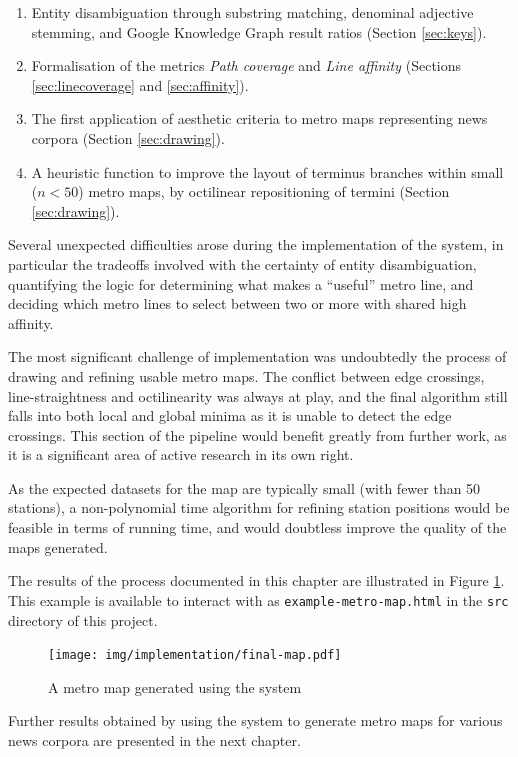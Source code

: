 \begin{enumerate}
	\item Entity disambiguation through substring matching, denominal adjective stemming, and Google Knowledge Graph result ratios (Section \ref{sec:keys}).
	\item Formalisation of the metrics \textit{Path coverage} and \textit{Line affinity} (Sections \ref{sec:linecoverage} and \ref{sec:affinity}).
	\item The first application of  aesthetic criteria to metro maps representing news corpora (Section \ref{sec:drawing}).
	\item A heuristic function to improve the layout of terminus branches within small ($n<50$) metro maps, by octilinear repositioning of termini (Section \ref{sec:drawing}). 
\end{enumerate}

Several unexpected difficulties arose during the implementation of the system, in particular the tradeoffs involved with the certainty of entity disambiguation, quantifying the logic for determining what makes a ``useful'' metro line, and deciding which metro lines to select between two or more with shared high affinity. 

The most significant challenge of implementation was undoubtedly the process of drawing and refining usable metro maps. The conflict between edge crossings, line-straightness and octilinearity was always at play, and the final algorithm still falls into both local and global minima as it is unable to detect the edge crossings. This section of the pipeline would benefit greatly from further work, as it is a significant area of active research in its own right. 

As the expected datasets for the map are typically small (with fewer than 50 stations), a non-polynomial time algorithm for refining station positions would be feasible in terms of running time, and would doubtless improve the quality of the maps generated.

The results of the process documented in this chapter are illustrated in Figure \ref{fig:final}. This example is available to interact with as \texttt{example-metro-map.html} in the \texttt{src} directory of this project.
\begin{figure}[htbp!]
	\centering
	\texttt{[image: img/implementation/final-map.pdf]}
	\caption{A metro map generated using the system}
	\label{fig:final}
\end{figure}

Further results obtained by using the system to generate metro maps for various news corpora are presented in the next chapter.

